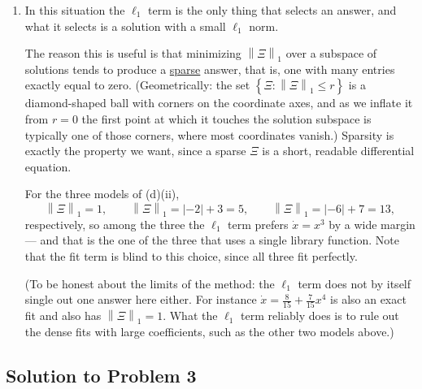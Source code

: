 \documentclass[a4paper,12pt]{article}
\begin{document}
\begin{enumerate}[label=(\alph*)]
\begin{enumerate}[label=(\roman*)]
\end{enumerate}

\item In this situation the $\ell_1$ term is the only thing that selects an answer, and what it selects is a solution with a small $\ell_1$ norm.

The reason this is useful is that minimizing $\left\| \Xi \right\|_1$ over a subspace of solutions tends to produce a \underline{sparse} answer, that is, one with many entries exactly equal to zero. (Geometrically: the set $\left\{ \Xi : \left\| \Xi \right\|_1 \leq r \right\}$ is a diamond-shaped ball with corners on the coordinate axes, and as we inflate it from $r=0$ the first point at which it touches the solution subspace is typically one of those corners, where most coordinates vanish.) Sparsity is exactly the property we want, since a sparse $\Xi$ is a short, readable differential equation.

For the three models of (d)(ii),
\[ \left\| \Xi \right\|_1 = 1, \qquad
\left\| \Xi \right\|_1 = \left| -2 \right|+3 = 5, \qquad
\left\| \Xi \right\|_1 = \left| -6 \right|+7 = 13 , \]
respectively, so among the three the $\ell_1$ term prefers $\dot{x}=x^3$ by a wide margin --- and that is the one of the three that uses a single library function. Note that the fit term is blind to this choice, since all three fit perfectly.

(To be honest about the limits of the method: the $\ell_1$ term does not by itself single out one answer here either. For instance $\dot{x}=\frac{8}{15}+\frac{7}{15}x^4$ is also an exact fit and also has $\left\| \Xi \right\|_1 = 1$. What the $\ell_1$ term reliably does is to rule out the dense fits with large coefficients, such as the other two models above.)

\end{enumerate}

\subsection*{Solution to Problem 3}
\end{document}
